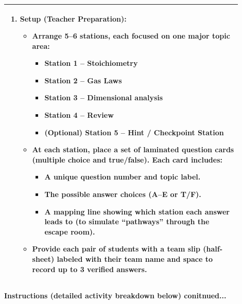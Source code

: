 \documentclass{article}
\begin{document}
{{\begin{tabular}{|p{0.9\linewidth}|}
\begin{enumerate}
    \item \textbf{Setup (Teacher Preparation):}
    \begin{itemize}
        \item Arrange \textbf{5–6 stations}, each focused on one major topic area:
        \begin{itemize}
            \item \textbf{Station 1 – Stoichiometry}
            \item \textbf{Station 2 – Gas Laws}
            \item \textbf{Station 3 – Dimensional analysis}
            \item \textbf{Station 4 – Review}
            \item \textbf{(Optional) Station 5 – Hint / Checkpoint Station}
        \end{itemize}
        \item At each station, place a set of laminated question cards (multiple choice and true/false). Each card includes:
        \begin{itemize}
            \item A unique question number and topic label.
            \item The possible answer choices (A–E or T/F).
            \item A mapping line showing which station each answer leads to (to simulate “pathways” through the escape room).
        \end{itemize}
        \item Provide each pair of students with a \textbf{team slip} (half-sheet) labeled with their team name and space to record up to 3 verified answers.
    \end{itemize}
\end{enumerate}
\\
\hline
\end{tabular}
\newpage

\vspace{0.5cm}
\noindent
{\large \textbf{Instructions (detailed activity breakdown below) conitnued...}} \\

}}
\end{document}
